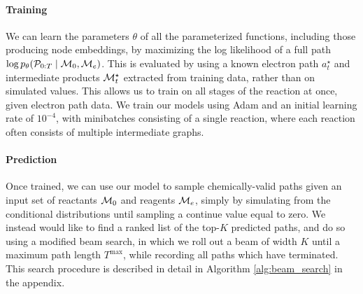 \paragraph{Training}
We can learn the parameters $\theta$ of all the parameterized functions, including those producing node embeddings, by maximizing the log likelihood of a full path $\log p_\theta({\mathcal{P}}_{0:T} \mid {\mathcal{M}}_0, {\mathcal{M}}_e)$.
This is evaluated by using a known electron path $a_t^\star$ and intermediate products ${\mathcal{M}}_t^\star$ extracted from training data,
rather than on simulated values. 
This allows us to train on all stages of the reaction at once, given electron path data.
We train our models using Adam \citep{kingma2014adam} and an initial learning rate of $10^{-4}$,
with minibatches consisting of a single reaction, where each reaction often consists of multiple intermediate graphs.

\paragraph{Prediction}
Once trained, we can use our model to sample chemically-valid paths given an input set of reactants ${\mathcal{M}}_0$ and reagents ${\mathcal{M}}_e$, 
simply by simulating from the conditional distributions until sampling a continue value equal to zero.
We instead would like to find a ranked list of the top-$K$ predicted paths, and do so using a modified beam search,
in which we roll out a beam of width $K$ until a maximum path length $T^\mathrm{max}$,
while recording all paths which have terminated.
This search procedure is described in detail in Algorithm \ref{alg:beam_search} in the appendix.



